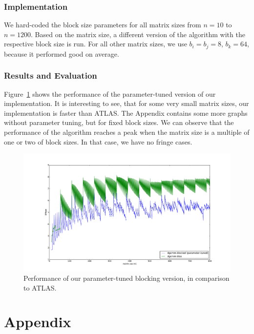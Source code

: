 \documentclass[12pt]{article}
\begin{document}
\subsubsection{Implementation}
We hard-coded the block size parameters for all matrix sizes from $n=10$ to $n=1200$. Based on the matrix size, a different version of the algorithm with the respective block size is run. For all other matrix sizes, we use $b_i=b_j=8$, $b_k=64$, because it performed good on average.

\subsubsection{Results and Evaluation}
Figure~\ref{fig:param_results} shows the performance of the parameter-tuned version of our implementation. It is interesting to see, that for some very small matrix sizes, our implementation is faster than ATLAS. The Appendix contains some more graphs without parameter tuning, but for fixed block sizes. We can observe that the performance of the algorithm reaches a peak when the matrix size is a multiple of one or two of block sizes. In that case, we have no fringe cases.
\begin{figure}
	\includegraphics[width=\textwidth]{graphs/profiles/PROFILE_BLOCKED.pdf}
	\caption{Performance of our parameter-tuned blocking version, in comparison to ATLAS.}
	\label{fig:param_results}
\end{figure}

\newpage
\section*{Appendix}
\end{document}
